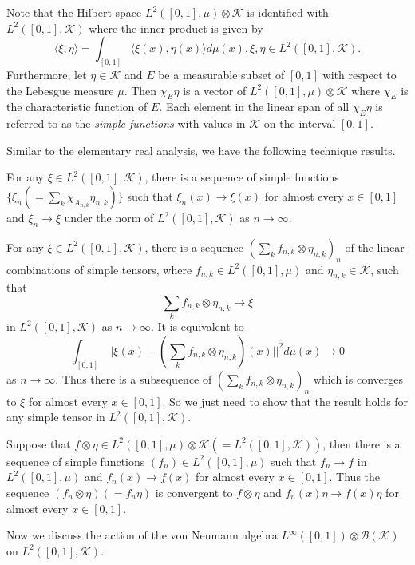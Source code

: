 \documentclass[12pt]{article}
\begin{document}
Note that the Hilbert space $L^{2}([0,1],\mu)\otimes\mathcal{K}$ is
identified with $L^{2}([0,1],\mathcal{K})$ where the inner product
is given by {\cite{[Ta]}}
$$\langle\xi,\eta\rangle=\int_{[0,1]}\langle\xi(x),\eta(x)\rangle d\mu(x), \xi,\eta\in L^{2}([0,1],\mathcal{K}).$$
Furthermore, let $\eta\in\mathcal{K}$ and $E$ be a measurable subset
of $[0,1]$ with respect to the Lebesgue measure $\mu$. Then
$\chi_{E}\eta$ is a vector of $L^{2}([0,1],\mu)\otimes\mathcal{K}$
where $\chi_{E}$ is the characteristic function of $E$. Each element
in the linear span of all $\chi_{E}\eta$ is referred to as the {\it
simple functions} with values in $\mathcal{K}$ on the interval
$[0,1]$.




Similar to the elementary real analysis, we have the following
technique results.\vskip6pt

 For any $\xi\in L^{2}([0,1],\mathcal{K})$,
there is a sequence of simple functions
$\{\xi_{n}(=\sum_{k}\chi_{A_{n,k}}\eta_{n,k})\}$ such that
$\xi_{n}(x)\rightarrow\xi(x)$ for almost every $x\in [0,1]$ and
$\xi_{n}\rightarrow\xi$ under the norm of $L^{2}([0,1],\mathcal{K})$
as  $n\rightarrow\infty$. \vskip6pt

 For any $\xi\in L^{2}([0,1],\mathcal{K})$,
there is a sequence $(\sum_{k}f_{n,k}\otimes\eta_{n,k})_{n}$ of the
linear combinations of simple tensors, where $f_{n,k}\in
L^{2}([0,1],\mu)$ and $\eta_{n,k}\in\mathcal{K}$, such that
$$\sum_{k}f_{n,k}\otimes\eta_{n,k}\rightarrow\xi$$
in $L^{2}([0,1],\mathcal{K})$ as $n\rightarrow\infty$. It is
equivalent to
$$\int_{[0,1]}||\xi(x)-(\sum_{k}f_{n,k}\otimes\eta_{n,k})(x)||^{2}d\mu(x)\rightarrow 0$$ as
$n\rightarrow\infty$. Thus there is a subsequence of
$(\sum_{k}f_{n,k}\otimes\eta_{n,k})_{n}$ which is converges to $\xi$
for almost every $x\in [0,1]$. So we just need to show that the
result holds for any simple tensor in $L^{2}([0,1],\mathcal{K})$.

Suppose that $f\otimes\eta\in
L^{2}([0,1],\mu)\otimes\mathcal{K}(=L^{2}([0,1],\mathcal{K}))$, then
there is a sequence of simple functions $(f_{n})\in
L^{2}([0,1],\mu)$ such that $f_{n}\rightarrow f$ in
$L^{2}([0,1],\mu)$ and $f_{n}(x)\rightarrow f(x)$ for almost every
$x\in [0,1]$. Thus the sequence $(f_{n}\otimes\eta)(=f_{n}\eta)$ is
convergent to $f\otimes\eta$ and $f_{n}(x)\eta\rightarrow f(x)\eta$
for almost every $x\in [0,1]$.\endproof

\vskip4pt

Now we discuss the action of the von Neumann algebra
$L^{\infty}([0,1])\otimes\mathcal{B}(\mathcal{K})$ on
$L^{2}([0,1],\mathcal{K})$.
\end{document}
